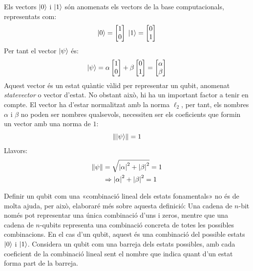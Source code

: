 Els vectors $\ket{0}$ i $\ket{1}$ són anomenats els vectors de la base computacionals, representats com:
$$
\ket{0} = \begin{bmatrix}
	1 \\ 0
\end{bmatrix} \;
\ket{1} = \begin{bmatrix}
	0 \\ 1
\end{bmatrix}
$$
Per tant el vector $\ket{\psi}$ és:
$$
\ket{\psi} 
= \alpha 
\begin{bmatrix}
	1 \\ 0
\end{bmatrix} + \beta 
\begin{bmatrix}
	0 \\ 1
\end{bmatrix}= 
\begin{bmatrix}
	\alpha \\ \beta
\end{bmatrix}
$$
Aquest vector és un estat quàntic vàlid per representar un qubit, anomenat \textit{statevector} o vector d'estat. No obstant això, hi ha un important factor a tenir en compte. El vector ha d'estar normalitzat amb la norma $\ell_2$, per tant, els nombres $\alpha$ i $\beta$ no poden ser nombres qualsevols, necessiten ser els coeficients que formin un vector amb una norma de $1$:
$$
\norm{\ket{\psi}} = 1 
$$
Llavors:
\begin{align*}
	\norm{\psi} &= \sqrt{\abs{\alpha}^2 + \abs{\beta}^2} = 1 \\
	&\Rightarrow \abs{\alpha}^2 + \abs{\beta}^2 = 1
\end{align*}

Definir un qubit com una «combinació lineal dels estats fonamentals» no és de molta ajuda, per això, elaboraré més sobre aquesta definició:
Una cadena de $n$-bit només pot representar una única combinació d'uns i zeros, mentre que una cadena de $n$-qubits representa una combinació concreta de totes les possibles combinacions. En el cas d'un qubit, aquest és una combinació del possible estats $\ket{0}$ i $\ket{1}$. Considera un qubit com una barreja dels estats possibles, amb cada coeficient de la combinació lineal sent el nombre que indica quant d'un estat forma part de la barreja. 

